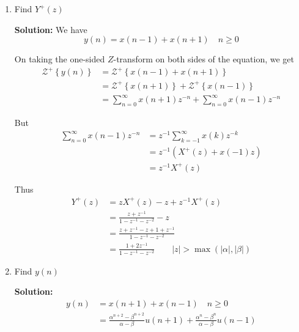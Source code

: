 \documentclass[journal,12pt,twocolumn]{IEEEtran}
\newcommand{\solution}{\noindent \textbf{Solution: }}
\providecommand{\brak}[1]{\ensuremath{\left(#1\right)}}
\providecommand{\cbrak}[1]{\ensuremath{\left\{#1\right\}}}
\providecommand{\abs}[1]{\left\vert#1\right\vert}
\numberwithin{equation}{section}
\renewcommand\thesection{\arabic{section}}
\begin{document}
\begin{enumerate}[label=\thesection.\arabic*,ref=\thesection.\theenumi]
\solution
Download the following Python code that plots Fig. \ref{fig-2}
\begin{lstlisting}
wget https://github.com/Ankit-Saha-2003/EE3900/raw/main/Pingala/codes/2.5.py
\end{lstlisting}

Run the code by executing
\begin{lstlisting}
python 2.5.py
\end{lstlisting}

\begin{figure}[!htp]
    \texttt{[image: 2.5.png]}
    \caption{Plot of $y(n)$}
    \label{fig-2}
\end{figure}

\item Find $Y^{+}(z)$

\solution We have
\begin{equation}
	y(n) = x(n-1) + x(n+1) \quad n \ge 0
\end{equation}

On taking the one-sided $Z$-transform on both sides of the equation, we get
\begin{align}
\mathcal{Z}^+\cbrak{y(n)} &= \mathcal{Z}^+\cbrak{x(n-1) + x(n+1)} \\
 &= \mathcal{Z}^+\cbrak{x(n + 1)} + \mathcal{Z}^+\cbrak{x(n - 1)} \\
 &= \sum_{n=0}^\infty x(n+1)z^{-n} + \sum_{n=0}^\infty x(n-1)z^{-n}
\end{align}

But
\begin{align}
	\sum_{n=0}^\infty x(n-1)z^{-n} &= z^{-1}\sum_{k=-1}^\infty x(k)z^{-k} \\
	&= z^{-1} \brak{X^+(z) + x(-1)z} \\
	&= z^{-1} X^+(z)
\end{align}

Thus
\begin{align}
Y^+(z) &= zX^+(z) - z + z^{-1}X^+(z)  \\
&= \frac{z + z^{-1}}{1 - z^{-1} - z^{-2}} - z \\
&= \frac{z + z^{-1} - z + 1 + z^{-1}}{1 - z^{-1} - z^{-2}} \\
&= \frac{1 + 2z^{-1}}{1 - z^{-1} - z^{-2}} \qquad |z| > \max\brak{\abs{\alpha}, \abs{\beta}}
\end{align}

\item Find $y(n)$

\solution 
\begin{align}
	y(n) &= x(n+1) + x(n-1) \quad n \ge 0 \\
	&= \frac{\alpha^{n+2} - \beta^{n+2}}{\alpha - \beta} u(n+1) + \frac{\alpha^{n} - \beta^{n}}{\alpha - \beta} u(n-1)
\end{align}


\end{enumerate}
\end{document}
